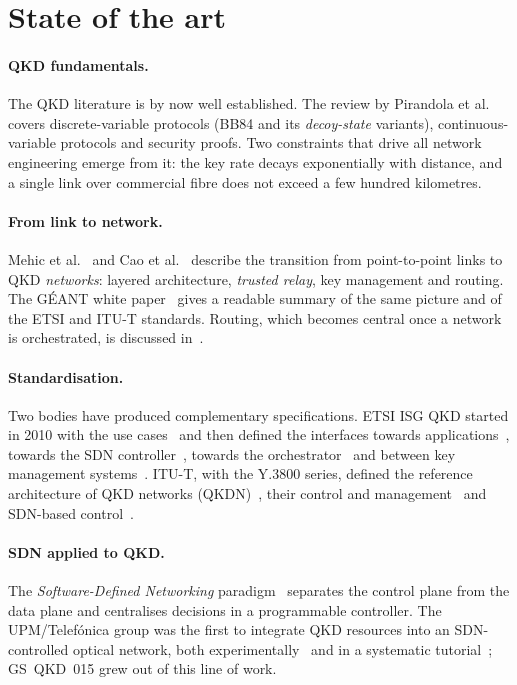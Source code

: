 \section{State of the art}
\label{sec:sota}

\paragraph{QKD fundamentals.}
The QKD literature is by now well established. The review by Pirandola
et al.~\cite{pirandola2020} covers discrete-variable protocols (BB84 and
its \emph{decoy-state} variants), continuous-variable protocols and
security proofs. Two constraints that drive all network engineering emerge
from it: the key rate decays exponentially with distance, and a single
link over commercial fibre does not exceed a few hundred kilometres.

\paragraph{From link to network.}
Mehic et al.~\cite{mehic2020} and Cao et al.~\cite{cao2022} describe the
transition from point-to-point links to QKD \emph{networks}: layered
architecture, \emph{trusted relay}, key management and routing. The GÉANT
white paper~\cite{geant2024} gives a readable summary of the same picture
and of the ETSI and ITU-T standards. Routing, which becomes central once a
network is orchestrated, is discussed in~\cite{routing2024}.

\paragraph{Standardisation.}
Two bodies have produced complementary specifications. ETSI ISG QKD started
in 2010 with the use cases~\cite{qkd002} and then defined the interfaces
towards applications~\cite{qkd004,qkd014}, towards the SDN
controller~\cite{qkd015}, towards the orchestrator~\cite{qkd018} and
between key management systems~\cite{qkd020}. ITU-T, with the Y.3800
series, defined the reference architecture of QKD networks
(QKDN)~\cite{ituy3800}, their control and management~\cite{ituy3804} and
SDN-based control~\cite{ituy3805}.

\paragraph{SDN applied to QKD.}
The \emph{Software-Defined Networking} paradigm~\cite{kreutz2015} separates
the control plane from the data plane and centralises decisions in a
programmable controller. The UPM/Telefónica group was the first to
integrate QKD resources into an SDN-controlled optical network, both
experimentally~\cite{aguado2016} and in a systematic
tutorial~\cite{aguado2020}; GS~QKD~015 grew out of this line of work.

